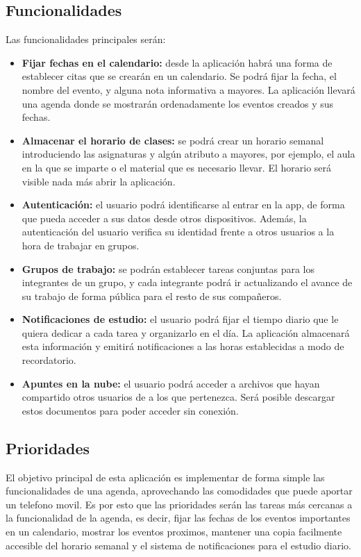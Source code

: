 \documentclass[a4paper,openright,12pt]{article}
\begin{document}
\subsection{Funcionalidades}
Las funcionalidades principales serán:
\begin{itemize}
\item \textbf{Fijar fechas en el calendario:} desde la aplicación habrá una forma de establecer citas que se crearán en un calendario. Se podrá fijar la fecha, el nombre del evento, y alguna nota informativa a mayores. La aplicación llevará una agenda donde se mostrarán ordenadamente los eventos creados y sus fechas.

\item \textbf{Almacenar el horario de clases:} se podrá crear un horario semanal introduciendo las asignaturas y algún atributo a mayores, por ejemplo, el aula en la que se imparte o el material que es necesario llevar. El horario será visible nada más abrir la aplicación.

\item \textbf{Autenticación:} el usuario podrá identificarse al entrar en la app, de forma que pueda acceder a sus datos desde otros dispositivos. Además, la autenticación del usuario verifica su identidad frente a otros usuarios a la hora de trabajar en grupos.

\item \textbf{Grupos de trabajo:} se podrán establecer tareas conjuntas para los integrantes de un grupo, y cada integrante podrá ir actualizando el avance de su trabajo de forma pública para el resto de sus compañeros.

\item \textbf{Notificaciones de estudio:} el usuario podrá fijar el tiempo diario que le quiera dedicar a cada tarea y organizarlo en el día. La aplicación almacenará esta información y emitirá notificaciones a las horas establecidas a modo de recordatorio.

\item \textbf{Apuntes en la nube:} el usuario podrá acceder a archivos que hayan compartido otros usuarios de a los que pertenezca. Será posible descargar estos documentos para poder acceder sin conexión. 
\end{itemize}

\subsection{Prioridades}
El objetivo principal de esta aplicación es implementar de forma simple las funcionalidades de una agenda, aprovechando las comodidades que puede aportar un telefono movil. Es por esto que las prioridades serán las tareas más cercanas a la funcionalidad de la agenda, es decir, fijar las fechas de los eventos importantes en un calendario, mostrar los eventos proximos, mantener una copia facilmente accesible del horario semanal y el sistema de notificaciones para el estudio diario. 
\end{document}
